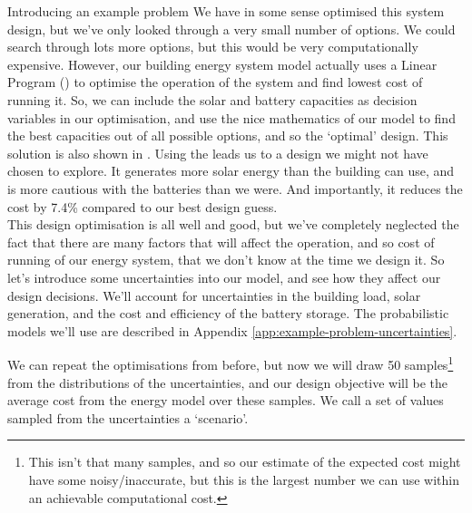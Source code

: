 \begin{ebox}[label=ebox:opt]{Introducing an example problem}
    We have in some sense optimised this system design, but we've only looked through a very small number of options. We could search through lots more options, but this would be very computationally expensive. However, our building energy system model actually uses a Linear Program () to optimise the operation of the system and find lowest cost of running it. So, we can include the solar and battery capacities as decision variables in our  optimisation, and use the nice mathematics of our model to find the best capacities out of all possible options, and so the `optimal' design. This solution is also shown in . Using the   leads us to a design we might not have chosen to explore. It generates more solar energy than the building can use, and is more cautious with the batteries than we were. And importantly, it reduces the cost by 7.4\% compared to our best design guess.\\

    This design optimisation is all well and good, but we've completely neglected the fact that there are many factors that will affect the operation, and so cost of running of our energy system, that we don't know at the time we design it. So let's introduce some uncertainties into our model, and see how they affect our design decisions. We'll account for uncertainties in the building load, solar generation, and the cost and efficiency of the battery storage. The probabilistic models we'll use are described in Appendix \ref{app:example-problem-uncertainties}.

    We can repeat the optimisations from before, but now we will draw 50 samples\footnote{This isn't that many samples, and so our estimate of the expected cost might have some noisy/inaccurate, but this is the largest number we can use within an achievable computational cost.} from the distributions of the uncertainties, and our design objective will be the average cost from the energy model over these samples. We call a set of values sampled from the uncertainties a `scenario'.


\end{ebox}
